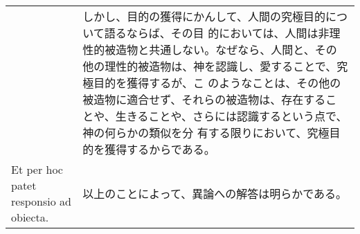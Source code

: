 \documentclass[10pt]{jsarticle} %
\begin{document}
\begin{longtable}{p{21em}p{21em}}
&

 しかし、目的の獲得にかんして、人間の究極目的について語るならば、その目
 的においては、人間は非理性的被造物と共通しない。なぜなら、人間と、その
 他の理性的被造物は、神を認識し、愛することで、究極目的を獲得するが、こ
のようなことは、その他の被造物に適合せず、それらの被造物は、存在するこ
 とや、生きることや、さらには認識するという点で、神の何らかの類似を分
 有する限りにおいて、究極目的を獲得するからである。

\\


Et per hoc patet responsio ad obiecta.


&

 以上のことによって、異論への解答は明らかである。

\end{longtable}
\end{document}
